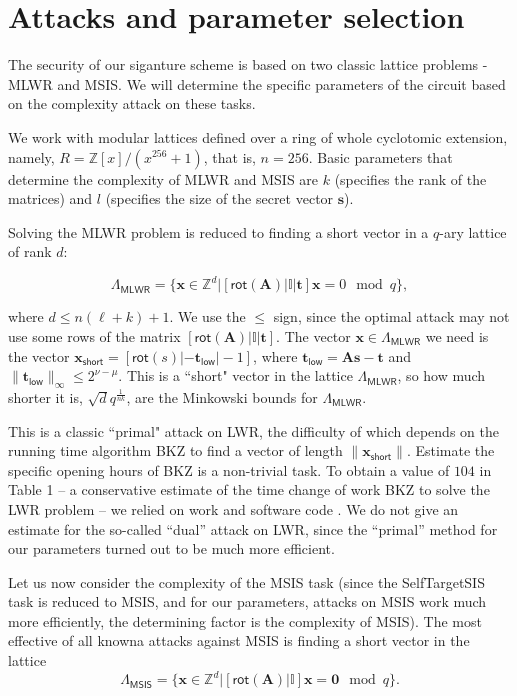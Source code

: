 \documentclass{article}
\theoremstyle{plain}
\theoremstyle{definition}
\begin{document}
    \section{Attacks and parameter selection}
    \label{sec:attacks}

    The security of our siganture scheme is based on two classic lattice problems - MLWR and MSIS. We will determine the specific parameters of the circuit based on the complexity attack on these tasks.
    
    We work with modular lattices defined over a ring of whole cyclotomic extension, namely, $R = \mathbb{Z}[x]/(x^{256} + 1)$, that is, $n = 256$. Basic parameters that determine the complexity of MLWR and MSIS are $k$ (specifies the rank of the matrices) and $l$ (specifies the size of the secret vector $\mathbf{s}$).
    
    Solving the MLWR problem is reduced to finding a short vector in a $q$-ary lattice of rank $d$:

    $$
    \varLambda_{\mathsf{MLWR}} = \{\mathbf{x} \in \mathbb{Z}^d | [\mathsf{rot}(\mathbf{A}) | \mathbb{I} | \mathbf{t}] \mathbf{x} = 0 \mod q\},
    $$
    
    where $d \leq n (\ell + k) + 1$. We use the $\leq$ sign, since the optimal attack may not use some rows of the matrix $[\mathsf{rot}(\mathbf{A}) | \mathbb{I} | \mathbf{t} ]$. The vector $\mathbf{x} \in \varLambda_{\mathsf{MLWR}}$ we need is the vector $\mathbf{x}_\mathsf{short} = [\mathsf{rot}(s)|-\mathbf{t}_\mathsf{low}| -1]$, where $\mathbf{t}_\mathsf{low} = \mathbf{As} - \mathbf{t}$ and $\|\mathbf{t}_\mathsf{low}\|_\infty \leq 2^{\nu - \mu}$. This is a ``short" vector in the lattice $\varLambda_{\mathsf{MLWR}}$, so how much shorter it is, $\sqrt{d}q^{\frac{1}{nk}}$, are the Minkowski bounds for $\varLambda_{\mathsf{MLWR}}$.

    This is a classic ``primal" attack on LWR, the difficulty of which depends on the running time algorithm BKZ to find a vector of length $\|\mathbf{x}_\mathsf{short}\|$. Estimate the specific opening hours of BKZ is a non-trivial task. To obtain a value of $104$ in Table 1 -- a conservative estimate of the time change of work BKZ to solve the LWR problem -- we relied on work \cite{AGVW17} and software code \cite{ACD+18}. We do not give an estimate for the so-called ``dual'' attack on LWR, since the ``primal'' method for our parameters turned out to be much more efficient.
    
    Let us now consider the complexity of the MSIS task (since the SelfTargetSIS task is reduced to MSIS, and for our parameters, attacks on MSIS work much more efficiently, the determining factor is the complexity of MSIS). The most effective of all knowna attacks against MSIS is finding a short vector in the lattice
    $$
    \varLambda_{\mathsf{MSIS}} = \{\mathbf{x} \in \mathbb{Z}^{d} | [\mathsf{rot}(\mathbf{A}) | \mathbb{I}] \mathbf{x} = \mathbf{0} \mod q\}.
    $$
    
\end{document}
